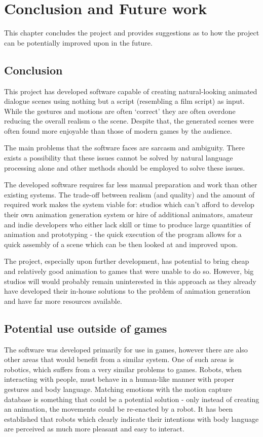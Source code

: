 \chapter{Conclusion and Future work \label{chap:conclusion}}
This chapter concludes the project and provides suggestions as to how the project can be potentially improved upon in the future.

\section{Conclusion}
This project has developed software capable of creating natural-looking animated dialogue scenes using nothing but a script (resembling a film script) as input. While the gestures and motions are often `correct' they are often overdone reducing the overall realism o the scene. Despite that, the generated scenes were often found more enjoyable than those of modern games by the audience.

The main problems that the software faces are sarcasm and ambiguity. There exists a possibility that these issues cannot be solved by natural language processing alone and other methods should be employed to solve these issues.

The developed software requires far less manual preparation and work than other existing systems. The trade-off between realism (and quality) and the amount of required work makes the system viable for: studios which can't afford to develop their own animation generation system or hire of additional animators, amateur and indie developers who either lack skill or time to produce large quantities of animation and prototyping - the quick execution of the program allows for a quick assembly of a scene which can be then looked at and improved upon.

The project, especially upon further development, has potential to bring cheap and relatively good animation to games that were unable to do so. However, big studios will would probably remain uninterested in this approach as they already have developed their in-house solutions to the problem of animation generation and have far more resources available.

\section{Potential use outside of games}
The software was developed primarily for use in games, however there are also other areas that would benefit from a similar system. One of such areas is robotics, which suffers from a very similar problems to games. Robots, when interacting with people, must behave in a human-like manner with proper gestures and body language. Matching emotions with the motion capture database is something that could be a potential solution - only instead of creating an animation, the movements could be re-enacted by a robot. It has been established that robots which clearly indicate their intentions with body language are perceived as much more pleasant and easy to interact.~\cite{mutlurobots}


